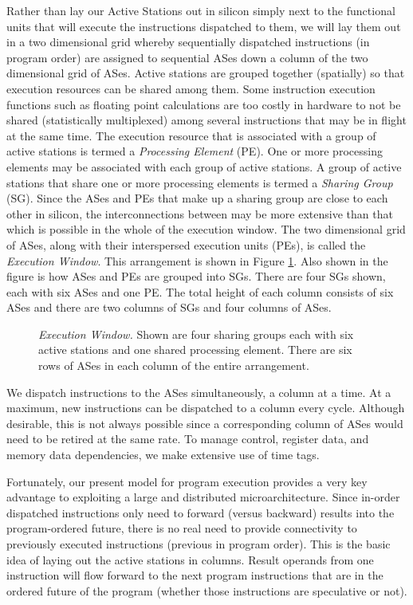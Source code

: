 \documentclass[10pt,dvips]{article}
\begin{document}
Rather than lay our Active Stations out in silicon simply next to
the functional units that will execute the instructions 
dispatched to them,
we will lay them out in a two dimensional grid whereby sequentially
dispatched instructions (in program order) are assigned to 
sequential ASes down a column of
the two dimensional grid of ASes.  
Active stations are grouped together (spatially) so that execution resources
can be shared among them.  Some instruction execution functions such
as floating point calculations are too costly in hardware to not
be shared (statistically multiplexed) among several instructions
that may be in flight at the same time.
The execution resource that is associated with a group of active stations
is termed a \textit{Processing Element} (PE).  One or more processing
elements may be associated with each group of active stations.
A group of active stations that share one or more processing elements
is termed a \textit{Sharing Group} (SG).
Since the ASes and PEs that make up a sharing group are close to each
other in silicon, the interconnections between may be more
extensive than that which is possible in the whole of the execution window.
The two dimensional
grid of ASes, along with their interspersed execution units (PEs),
is called the {\em Execution Window}.
This arrangement is shown in Figure \ref{fig:window}.  
Also shown
in the figure is how ASes and PEs are grouped into SGs.
There are four SGs shown, each with six ASes and one PE.
The total height of each column consists of six ASes and there
are two columns of SGs and four columns of ASes.
%
\begin{figure}
\centering
{}
\caption{{\em Execution Window.} Shown are four sharing groups
each with six active stations and one shared processing element.
There are six rows of ASes in each column of the entire arrangement.}
\label{fig:window}
\end{figure}
%
We dispatch instructions to the ASes simultaneously, a column at
a time.  At a maximum, new instructions can be dispatched to a column every
cycle.  Although desirable, this is not always possible since a
corresponding column of ASes would need to be retired at the same rate.
To manage control, register data, and memory
data dependencies, we make extensive use of time tags.

Fortunately, our present model for program execution provides
a very key advantage to exploiting a large and distributed microarchitecture.
Since in-order dispatched instructions 
only need to forward (versus backward) results into the
program-ordered future, there is no real need to provide connectivity
to previously executed instructions 
(previous in program order).  This is the basic
idea of laying out the active stations in columns.  Result operands
from one instruction will flow forward to the next program instructions
that are in the ordered future of the program (whether those
instructions are speculative or not).  
%
%
\end{document}
